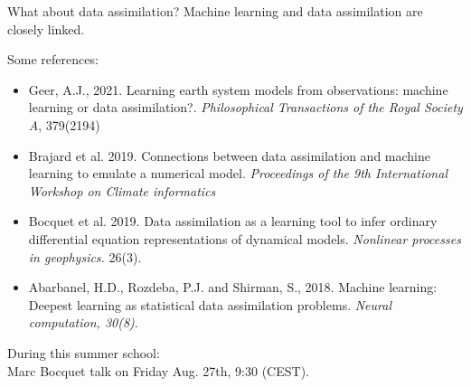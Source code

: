 \documentclass[handout, 10pt]{beamer}
\begin{document}
\begin{frame}{What about data assimilation?}
    \alert{Machine learning and data assimilation are closely linked.}\\
 { \footnotesize   
     Some references:
 \begin{itemize}
     \item Geer, A.J., 2021. Learning earth system models from observations: machine learning or data assimilation?. {\it Philosophical Transactions of the Royal Society A}, 379(2194)
     \item  Brajard  et al. 2019. Connections between data assimilation and machine learning to emulate a numerical model. {\it Proceedings of the 9th International Workshop on Climate informatics}
     \item Bocquet et al. 2019. Data assimilation as a learning tool to infer ordinary differential equation representations of dynamical models. {\it Nonlinear processes in geophysics.} 26(3).
     \item Abarbanel, H.D., Rozdeba, P.J. and Shirman, S., 2018. Machine learning: Deepest learning as statistical data assimilation problems. {\it Neural computation, 30(8)}.
 \end{itemize}

}
  During this summer school:\\
  \alert{Marc Bocquet talk on Friday Aug. 27th, 9:30 (CEST).}

\end{frame}
\end{document}
